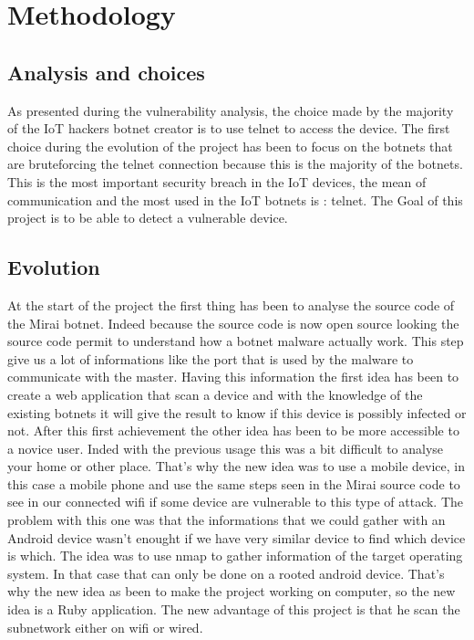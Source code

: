 \documentclass{report}
\begin{document}
\chapter{Methodology}
\section{Analysis and choices}
As presented during the vulnerability analysis, the choice made by the majority of the IoT hackers botnet creator is to use telnet to access the device. \newline
The first choice during the evolution of the project has been to focus on the botnets that are bruteforcing the telnet connection because this is the majority of the botnets.
This is the most important security breach in the IoT devices, the mean of communication and the most used in the IoT botnets is : telnet. The Goal of this project is to be able to detect a vulnerable device.

\section{Evolution}
At the start of the project the first thing has been to analyse the source code of the Mirai botnet. Indeed because the source code is now open source looking the source code permit to understand how a botnet malware actually work. This step give us a lot of informations like the port that is used by the malware to communicate with the master.\newline
Having this information the first idea has been to create a web application that scan a device and with the knowledge of the existing botnets it will give the result to know if this device is possibly infected or not.\newline
After this first achievement the other idea has been to be more accessible to a novice user. Inded with the previous usage this was a bit difficult to analyse your home or other place.\newline
That's why the new idea was to use a mobile device, in this case a mobile phone and use the same steps seen in the Mirai source code to see in our connected wifi if some device are vulnerable to this type of attack.\newline
The problem with this one was that the informations that we could gather with an Android device wasn't enought if we have very similar device to find which device is which. The idea was to use nmap to gather information of the target operating system. In that case that can only be done on a rooted android device. That's why the new idea as been to make the project working on computer, so the new idea is a Ruby application. The new advantage of this project is that he scan the subnetwork either on wifi or wired.
\end{document}
